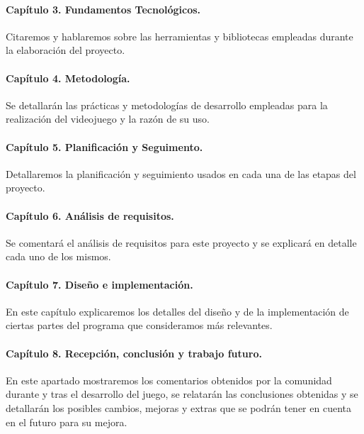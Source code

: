 \paragraph*{Capítulo 3. Fundamentos Tecnológicos.}
Citaremos y hablaremos sobre las herramientas y bibliotecas empleadas durante la elaboración del proyecto.

\paragraph*{Capítulo 4. Metodología.}
Se detallarán las prácticas y metodologías de desarrollo empleadas para la realización del videojuego y la razón de su uso.

\paragraph*{Capítulo 5. Planificación y Seguimento.}
Detallaremos la planificación y seguimiento usados en cada una de las etapas del proyecto. 

\paragraph*{Capítulo 6. Análisis de requisitos.}
Se comentará el análisis de requisitos para este proyecto y se explicará en detalle cada uno de los mismos.

\paragraph*{Capítulo 7. Diseño e implementación.}
En este capítulo explicaremos los detalles del diseño y de la implementación de ciertas partes del programa que consideramos más relevantes.

\paragraph*{Capítulo 8. Recepción, conclusión y trabajo futuro.}
En este apartado mostraremos los comentarios obtenidos por la comunidad durante y tras el desarrollo del juego, se relatarán las conclusiones obtenidas y se detallarán los posibles cambios, mejoras y extras que se podrán tener en cuenta en el futuro para su mejora.
